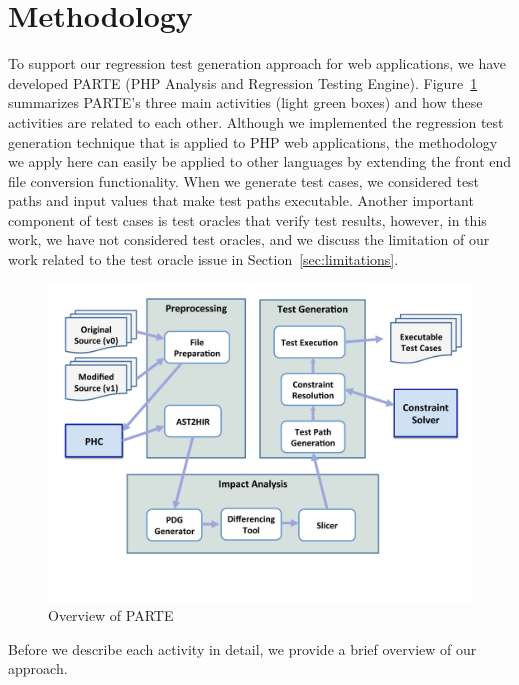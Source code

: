\section{Methodology}
\label{sec:method}

To support our regression test generation approach 
for web applications, we have developed PARTE (PHP 
Analysis and Regression Testing Engine).
Figure~\ref{fig:overview} summarizes PARTE's three 
main activities (light green boxes) and how these 
activities are related to each other.
Although we implemented the regression test generation technique
that is applied to PHP web applications, the methodology we apply 
here can easily be applied to other languages by extending the 
front end file conversion functionality.   
When we generate test cases, we considered test paths and input
values that make test paths executable. Another important component 
of test cases is test oracles that verify test results, however, 
in this work, we have not considered test oracles, and we discuss
the limitation of our work related to the test oracle issue in 
Section~\ref{sec:limitations}.

\begin{figure}[!ht]
\centering
\includegraphics[width=0.8\columnwidth]{figures/parte-overview.pdf}
\vspace*{-40pt}
 \caption{Overview of PARTE} 
\label{fig:overview}
\end{figure}

Before we describe each activity in detail,
we provide a brief overview of our approach.

